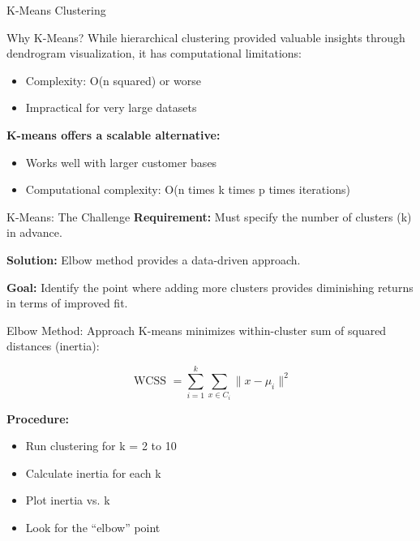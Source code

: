 \documentclass[aspectratio=169,ignorenonframetext]{beamer}
\begin{document}
\begin{frame}{K-Means Clustering}
\begin{block}{Why K-Means?}
While hierarchical clustering provided valuable insights through
dendrogram visualization, it has computational limitations:

\begin{itemize}
\item
  Complexity: O(n squared) or worse
\item
  Impractical for very large datasets
\end{itemize}

\textbf{K-means offers a scalable alternative:}

\begin{itemize}
\item
  Works well with larger customer bases
\item
  Computational complexity: O(n times k times p times iterations)
\end{itemize}
\end{block}
\end{frame}

\begin{frame}{K-Means: The Challenge}
\textbf{Requirement:} Must specify the number of clusters (k) in
advance.

\textbf{Solution:} Elbow method provides a data-driven approach.

\textbf{Goal:} Identify the point where adding more clusters provides
diminishing returns in terms of improved fit.
\end{frame}

\begin{frame}{Elbow Method: Approach}
K-means minimizes within-cluster sum of squared distances (inertia):

\[\text{ WCSS } = \sum_{i = 1}^{k}\sum_{x \in C_{i}}\| x - \mu_{i}\|^{2}\]

\textbf{Procedure:}

\begin{itemize}
\item
  Run clustering for k = 2 to 10
\item
  Calculate inertia for each k
\item
  Plot inertia vs. k
\item
  Look for the ``elbow'' point
\end{itemize}
\end{frame}
\end{document}
